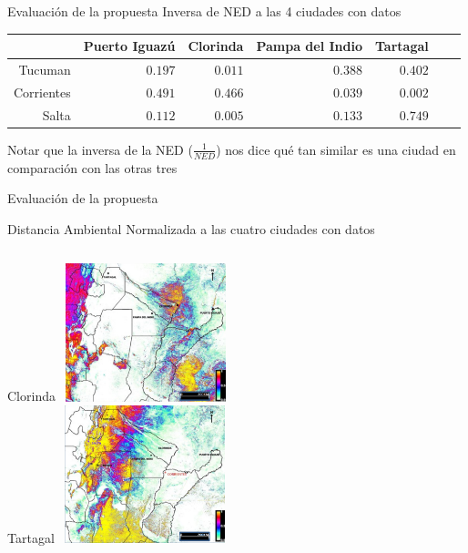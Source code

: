 \documentclass[10pt]{beamer}
\begin{document}
\begin{frame}{Evaluación de la propuesta}
\centering
Inversa de NED a las 4 ciudades con datos
\begin{tabular}{*7{r}}
\toprule
& Puerto Iguazú
& Clorinda
& Pampa del Indio
& Tartagal \\ \midrule
Tucuman
&$0.197$
&$0.011$
&$0.388$%
&$0.402$\\
Corrientes
&$0.491$
&$0.466$
&$0.039$
&$0.002$ \\
Salta
&$0.112$
&$0.005$
&$0.133$   %
&$0.749$ \\
\bottomrule
\end{tabular}
\pause
\begin{center}
  Notar que la inversa de la NED ($\frac{1}{NED}$) nos dice qué tan similar
  es una ciudad en comparación con las otras tres
\end{center}

\end{frame}


\begin{frame}{Evaluación de la propuesta}
  \begin{center}
    Distancia Ambiental Normalizada a las cuatro ciudades con datos
  \end{center}

  \begin{columns}[t]
  \centering
  Clorinda
  \includegraphics[width=5cm,height=4cm]{ned_clorinda}\\
  \centering
  Tartagal
  \includegraphics[width=5cm,height=4cm]{ned_tartagal}
  \end{columns}

\end{frame}
\end{document}
